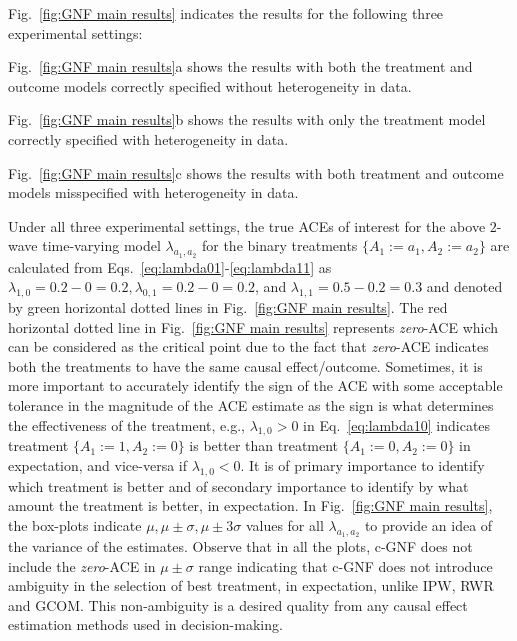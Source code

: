 \documentclass[letterpaper]{article} %
\begin{document}
Fig.~\ref{fig:GNF main results} indicates the results for the following three experimental settings:
\begin{inparaenum}[(i)]
\item Fig.~\ref{fig:GNF main results}a shows the results with both the treatment and outcome models correctly specified without heterogeneity in data.
\item Fig.~\ref{fig:GNF main results}b shows the results with only the treatment model correctly specified with heterogeneity in data.
\item Fig.~\ref{fig:GNF main results}c shows the results with both treatment and outcome models misspecified with heterogeneity in data.
\end{inparaenum}
Under all three experimental settings, the true ACEs of interest for the above $2$-wave time-varying model $\lambda_{a_1,a_2}$ for the binary treatments $\{{A_1}{ := }a_1, {A_2}{ := }a_2\}$ are calculated from Eqs.~\eqref{eq:lambda01}-\eqref{eq:lambda11} as $\lambda_{1,0}{ = }{0.2{ - }0}{ = }0.2, \lambda_{0,1}{ = }{0.2{ - }0}{ = }0.2$, and $\lambda_{1,1}{ = }{0.5{ - }0.2}{ = }0.3$ and denoted by green horizontal dotted lines in Fig.~\ref{fig:GNF main results}.
The red horizontal dotted line in Fig.~\ref{fig:GNF main results} represents \emph{zero}-ACE which can be considered as the critical point due to the fact that \emph{zero}-ACE indicates both the treatments to have the same causal effect/outcome. Sometimes, it is more important to accurately identify the sign of the ACE with some acceptable tolerance in the magnitude of the ACE estimate as the sign is what determines the effectiveness of the treatment, e.g., $\lambda_{1,0}{ > }0$ in Eq.~\eqref{eq:lambda10} indicates treatment $\{{A_1}{ := }1, {A_2}{ := }0\}$ is better than treatment $\{{A_1}{ := }0, {A_2}{ := }0\}$ in expectation, and vice-versa if $\lambda_{1,0}{ < }0$. It is of primary importance to identify which treatment is better and of secondary importance to identify by what amount the treatment is better, in expectation.
In Fig.~\ref{fig:GNF main results}, the box-plots indicate {$\mu, \mu{ \pm }\sigma,\mu{ \pm }3\sigma$} values for all $\lambda_{a_1,a_2}$ to provide an idea of the variance of the estimates.
Observe that in all the plots, c-GNF does not include the \emph{zero}-ACE in $\mu{ \pm }\sigma$ range indicating that c-GNF does not introduce ambiguity in the selection of best treatment, in expectation, unlike IPW, RWR and GCOM. This non-ambiguity is a desired quality from any causal effect estimation methods used in decision-making.
\end{document}
